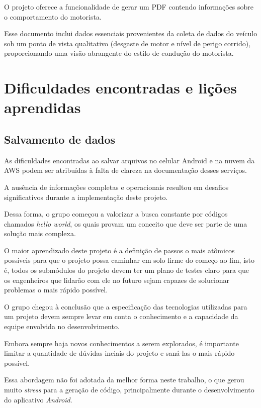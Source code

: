 O projeto oferece a funcionalidade de gerar um PDF contendo informações sobre o comportamento do motorista. 

Esse documento inclui dados essenciais provenientes da coleta de dados do veículo sob um ponto de vista qualitativo (desgaste de motor e nível de perigo corrido), proporcionando uma visão abrangente do estilo de condução do motorista.

\section{Dificuldades encontradas e lições aprendidas}

\subsection{Salvamento de dados}
    
    As dificuldades encontradas ao salvar arquivos no celular Android e na nuvem da AWS podem ser atribuídas à falta de clareza na documentação desses serviços.
    
    A ausência de informações completas e operacionais resultou em desafios significativos durante a implementação deste projeto.
    
    Dessa forma, o grupo começou a valorizar a busca constante por códigos chamados \textit{hello world}, os quais provam um conceito que deve ser parte de uma solução mais complexa.
    
    O maior aprendizado deste projeto é a definição de passos o mais atômicos possíveis para que o projeto possa caminhar em solo firme do começo ao fim, isto é, todos os submódulos do projeto devem ter um plano de testes claro para que os engenheiros que lidarão com ele no futuro sejam capazes de solucionar problemas o mais rápido possível.

    O grupo chegou à conclusão que a especificação das tecnologias utilizadas para um projeto devem sempre levar em conta o conhecimento e a capacidade da equipe envolvida no desenvolvimento.

    Embora sempre haja novos conhecimentos a serem explorados, é importante limitar a quantidade de dúvidas inciais do projeto e saná-las o mais rápido possível.

    Essa abordagem não foi adotada da melhor forma neste trabalho, o que gerou muito \textit{stress} para a geração de código, principalmente durante o desenvolvimento do aplicativo \textit{Android}.

